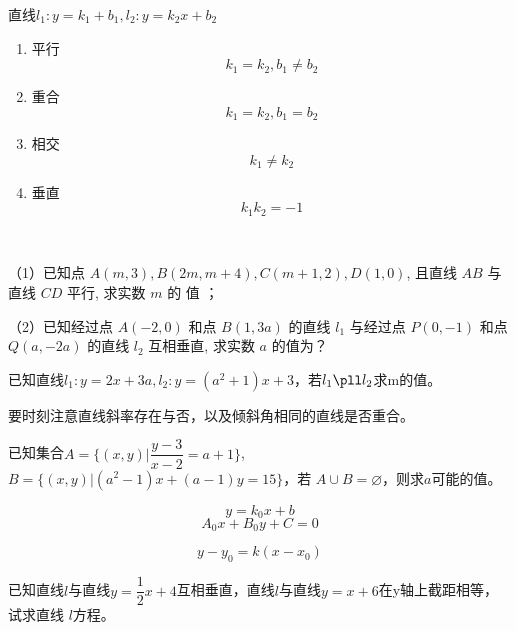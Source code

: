 \begin{corollary}
    直线\(l_1:y=k_1+b_1,l_2:y=k_2x+b_2\)
\begin{enumerate}[(1)]
    \item 平行
    \begin{equation}
        k_1=k_2,b_1\neq b_2
    \end{equation}
    \item 重合
    \begin{equation}
        k_1=k_2,b_1= b_2
    \end{equation}
    \item 相交
    \begin{equation}
        k_1\neq k_2
    \end{equation}
    \item 垂直
    \begin{equation}
        k_1k_2=-1
    \end{equation}
\end{enumerate}
\end{corollary}
\begin{example}
\ 

（1）已知点 $ A(m, 3), B(2 m, m+4), C(m+1,2), D(1,0) $, 且直线 $ A B $ 与直线 $ C D$  平行, 求实数  $m $ 的 值  ；

（2）已知经过点 $ A(-2,0) $ 和点  $B(1,3 a)$  的直线  $l_{1} $ 与经过点 $ P(0,-1)$ 和点  $Q(a,-2 a)$  的直线 $ l_{2} $ 互相垂直, 求实数  $a$  的值为？
\end{example}
\begin{exercise}
    已知直线\(l_1:y=2x+3a,l_2:y=(a^2+1)x+3\)，若\(l_1\pll l_2\)求m的值。
\end{exercise}


\begin{att}
    要时刻注意直线斜率存在与否，以及倾斜角相同的直线是否重合。
\end{att}
\begin{example}
    已知集合\(A=\{(x,y)|\dfrac{y-3}{x-2}=a+1\}\),\(B=\{(x,y)|(a^2-1)x+(a-1)y=15\}\)，若
    \(A\cup B=\varnothing \)，则求\(a\)可能的值。
\end{example}

\begin{definition}[平行直线束]
    \begin{equation}
        y=k_0x+b
    \end{equation}
    \begin{equation}
        A_0x+B_0y+C=0
    \end{equation}
\end{definition}
\begin{definition}[过定点的直线束]
    \begin{equation}
        y-y_0=k(x-x_0)
    \end{equation}
\end{definition}
\begin{example}
    已知直线\(l\)与直线\(y=\dfrac{1}{2}x+4\)互相垂直，直线\(l\)与直线\(y=x+6\)在y轴上截距相等，试求直线
    \(l\)方程。
\end{example}
\clearpage

